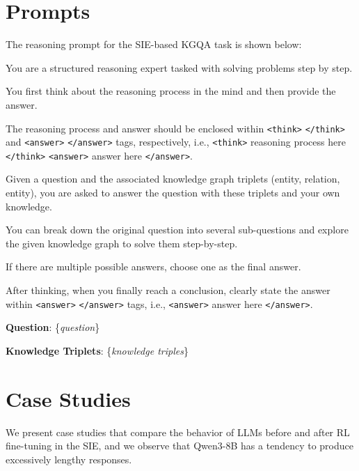 \documentclass{article} %
\begin{document}
\section{Prompts}
\label{appdx:c}


The reasoning prompt for the SIE-based KGQA task is shown below:


\begin{tcolorbox}[
  breakable,
  colback=gray!10,
  colframe=gray!60,
  title=Structured Reasoning Prompt for the SIE Framework,
  left=6pt,right=6pt,top=4pt,bottom=4pt,
  fontupper=\normalsize
]

You are a structured reasoning expert tasked with solving problems step by step. 

You first think about the reasoning process in the mind and then provide the answer. 

The reasoning process and answer should be enclosed within \texttt{<think>} \texttt{</think>} and \texttt{<answer>} \texttt{</answer>} tags, respectively, i.e., \texttt{<think>} reasoning process here \texttt{</think>} \texttt{<answer>} answer here \texttt{</answer>}. 

Given a question and the associated knowledge graph triplets (entity, relation, entity), you are asked to answer the question with these triplets and your own knowledge. 

You can break down the original question into several sub-questions and explore the given knowledge graph to solve them step-by-step. 

If there are multiple possible answers, choose one as the final answer. 

After thinking, when you finally reach a conclusion, clearly state the answer within \texttt{<answer>} \texttt{</answer>} tags, i.e., \texttt{<answer>} answer here \texttt{</answer>}. 

\vspace{2pt}

\textbf{Question}: \{\textit{question}\} 

\textbf{Knowledge Triplets}: \{\textit{knowledge triples}\}

\end{tcolorbox}




\section{Case Studies}

We present case studies that compare the behavior of LLMs before and after RL fine-tuning in the SIE, and we observe that Qwen3-8B has a tendency to produce excessively lengthy responses.
\end{document}
